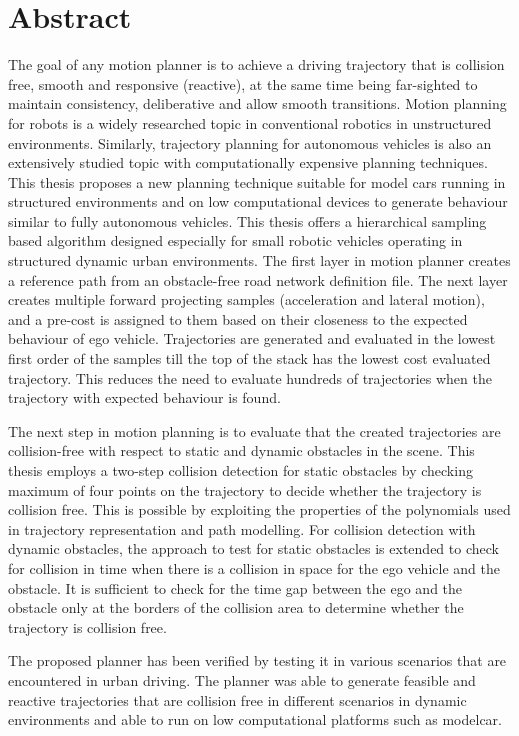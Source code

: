 \chapter*{Abstract}
The goal of any motion planner is to achieve a driving trajectory that is collision free, smooth and responsive (reactive), at the same time being far-sighted to maintain consistency, deliberative and allow smooth transitions. Motion planning for robots is a widely researched topic in conventional robotics in unstructured environments. Similarly, trajectory planning for autonomous vehicles is also an extensively studied topic with computationally expensive planning techniques. This thesis proposes a new planning technique suitable for model cars running in structured environments and on low computational devices to generate behaviour similar to fully autonomous vehicles. This thesis offers a hierarchical sampling based algorithm designed especially for small robotic vehicles operating in structured dynamic urban environments. The first layer in motion planner creates a reference path from an obstacle-free road network definition file. The next layer creates multiple forward projecting samples (acceleration and lateral motion), and a pre-cost is assigned to them based on their closeness to the expected behaviour of ego vehicle. Trajectories are generated and evaluated in the lowest first order of the samples till the top of the stack has the lowest cost evaluated trajectory. This reduces the need to evaluate hundreds of trajectories when the trajectory with expected behaviour is found. 

The next step in motion planning is to evaluate that the created trajectories are collision-free with respect to static and dynamic obstacles in the scene. This thesis employs a two-step collision detection for static obstacles by checking maximum of four points on the trajectory to decide whether the trajectory is collision free. This is possible by exploiting the properties of the polynomials used in trajectory representation and path modelling. For collision detection with dynamic obstacles, the approach to test for static obstacles is extended to check for collision in time when there is a collision in space for the ego vehicle and the obstacle. It is sufficient to check for the time gap between the ego and the obstacle only at the borders of the collision area to determine whether the trajectory is collision free. 

The proposed planner has been verified by testing it in various scenarios that are encountered in urban driving. The planner was able to generate feasible and reactive trajectories that are collision free in different scenarios in dynamic environments and able to run on low computational platforms such as modelcar. 
